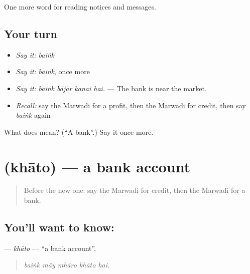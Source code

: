 \begin{grammarlens}[title={What you've built}]
One more word for reading notices and messages.
\end{grammarlens}

\subsection*{Your turn}
\begin{itemize}
\raggedright
  \item \emph{Say it:} \emph{baiṅk}
  \item \emph{Say it:} \emph{baiṅk}, once more
  \item \emph{Say it:} \emph{baiṅk bājār kanai hai.} — The bank is near the market.
  \item \emph{Recall:} say the Marwadi for a profit, then the Marwadi for credit, then say \emph{baiṅk} again
\end{itemize}

\begin{tcolorbox}[breakable,colback=teal!4,colframe=teal!35!black,title={Before you move on}]
What does  mean? (\textquotedblleft{}A bank\textquotedblright{}.) Say it once more.
\end{tcolorbox}
\section[\texorpdfstring{\mw{खातो} (khāto)}{खातो (khāto)}]{ (khāto) — a bank account}

\label{lesson:MW-C195-khato}



\begin{quote}
Before the new one: say the Marwadi for credit, then the Marwadi for a bank.
\end{quote}

\subsection*{You'll want to know: }
\textbf{} — \emph{khāto} — \textquotedblleft{}a bank account\textquotedblright{}.

\begin{quote}
    
\end{quote}

\begin{quote}
\emph{baiṅk mā̃y mhāro khāto hai.}
\end{quote}

